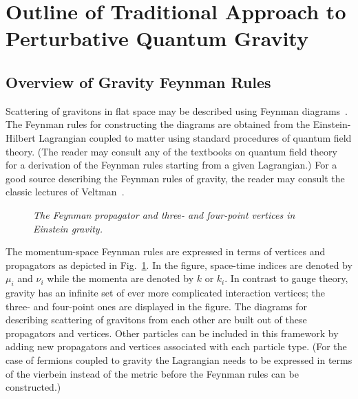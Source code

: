 \documentclass[12pt]{livrev}
\begin{document}
\section{Outline of Traditional Approach to Perturbative Quantum Gravity}
\label{section:traditional_approach}


\subsection{Overview of Gravity Feynman Rules}
\label{subsection:gravity_rules}

Scattering of gravitons in flat space may be described using Feynman
diagrams~\cite{DeWitt67A,DeWitt67B,VeltmanGravity}.  The Feynman rules
for constructing the diagrams are obtained from the Einstein-Hilbert
Lagrangian coupled to matter using standard procedures of quantum
field theory. (The reader may consult any of the textbooks on quantum
field theory~\cite{Peskin95,Weinberg95} for a derivation of the
Feynman rules starting from a given Lagrangian.) For a good source
describing the Feynman rules of gravity, the reader may consult the
classic lectures of Veltman~\cite{VeltmanGravity}.


\begin{figure}[h]
  \def\epsfsize#1#2{1.0#1}
  \centerline{}
  \caption{\it The Feynman propagator and three- and 
   four-point vertices in Einstein gravity.}
  \label{figure:GravityFeynman}
\end{figure}


The momentum-space Feynman rules are expressed in terms of vertices
and propagators as depicted in Fig.~\ref{figure:GravityFeynman}.  In
the figure, space-time indices are denoted by $\mu_i$ and $\nu_i$
while the momenta are denoted by $k$ or $k_i$. In contrast to gauge
theory, gravity has an infinite set of ever more complicated
interaction vertices; the three- and four-point ones are displayed in
the figure.  The diagrams for describing scattering of gravitons from
each other are built out of these propagators and vertices.  Other 
particles can be included in this framework by adding new propagators
and vertices associated with each particle type.
(For the case of fermions coupled to gravity the Lagrangian needs to be
expressed in terms of the vierbein instead of the metric before the
Feynman rules can be constructed.)
\end{document}
